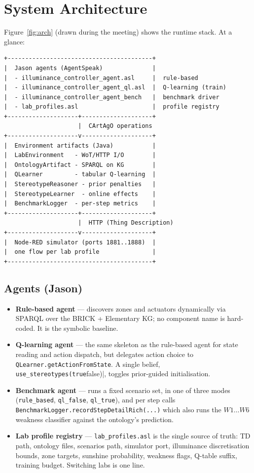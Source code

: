 \documentclass[conference]{IEEEtran}
\begin{document}
\section{System Architecture}
\label{sec:arch}

Figure~\ref{fig:arch} (drawn during the meeting) shows the runtime stack.
At a glance:

\begin{verbatim}
+-----------------------------------------+
|  Jason agents (AgentSpeak)              |
|  - illuminance_controller_agent.asl     |  rule-based
|  - illuminance_controller_agent_ql.asl  |  Q-learning (train)
|  - illuminance_controller_agent_bench   |  benchmark driver
|  - lab_profiles.asl                     |  profile registry
+--------------------+--------------------+
                     |  CArtAgO operations
+--------------------v--------------------+
|  Environment artifacts (Java)           |
|  LabEnvironment   - WoT/HTTP I/O        |
|  OntologyArtifact - SPARQL on KG        |
|  QLearner         - tabular Q-learning  |
|  StereotypeReasoner - prior penalties   |
|  StereotypeLearner  - online effects    |
|  BenchmarkLogger  - per-step metrics    |
+--------------------+--------------------+
                     |  HTTP (Thing Description)
+--------------------v--------------------+
|  Node-RED simulator (ports 1881..1888)  |
|  one flow per lab profile               |
+-----------------------------------------+
\end{verbatim}

\subsection{Agents (Jason)}
\begin{itemize}
  \item \textbf{Rule-based agent} --- discovers zones and actuators
        dynamically via SPARQL over the BRICK + Elementary KG; no
        component name is hard-coded. It is the symbolic baseline.
  \item \textbf{Q-learning agent} --- the same skeleton as the
        rule-based agent for state reading and action dispatch, but
        delegates action choice to \texttt{QLearner.getActionFromState}.
        A single belief, \verb|use_stereotypes(true|false)|, toggles
        prior-guided initialisation.
  \item \textbf{Benchmark agent} --- runs a fixed scenario set, in one
        of three modes (\verb|rule_based|, \verb|ql_false|, \verb|ql_true|),
        and per step calls \verb|BenchmarkLogger.recordStepDetailRich(...)|
        which also runs the $W1\ldots W6$ weakness classifier against
        the ontology's prediction.
  \item \textbf{Lab profile registry} --- \verb|lab_profiles.asl| is the
        single source of truth: TD path, ontology files, scenarios path,
        simulator port, illuminance discretisation bounds, zone targets,
        sunshine probability, weakness flags, Q-table suffix, training
        budget. Switching labs is one line.
\end{itemize}
\end{document}
